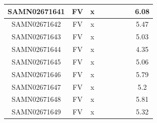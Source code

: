 \documentclass[../main.tex]{subfiles}
\begin{document}
\begin{flushleft}
\begin{footnotesize}
\begin{longtable}{|c|c|c|c|c|c|c|}
    \hline
    SAMN02671641  & FV    & x                                                            & ~          & ~                                                                           & ~                                                                 & 6.08      \\ 
    \hline
    SAMN02671642  & FV    & x                                                            & ~          & ~                                                                           & ~                                                                 & 5.47      \\ 
    \hline
    SAMN02671643  & FV    & x                                                            & ~          & ~                                                                           & ~                                                                 & 5.03      \\ 
    \hline
    SAMN02671644  & FV    & x                                                            & ~          & ~                                                                           & ~                                                                 & 4.35      \\ 
    \hline
    SAMN02671645  & FV    & x                                                            & ~          & ~                                                                           & ~                                                                 & 5.06      \\ 
    \hline
    SAMN02671646  & FV    & x                                                            & ~          & ~                                                                           & ~                                                                 & 5.79      \\ 
    \hline
    SAMN02671647  & FV    & x                                                            & ~          & ~                                                                           & ~                                                                 & 5.2       \\ 
    \hline
    SAMN02671648  & FV    & x                                                            & ~          & ~                                                                           & ~                                                                 & 5.81      \\ 
    \hline
    SAMN02671649  & FV    & x                                                            & ~          & ~                                                                           & ~                                                                 & 5.32      \\ 

\end{longtable}
\end{footnotesize}
\end{flushleft}
\end{document}
